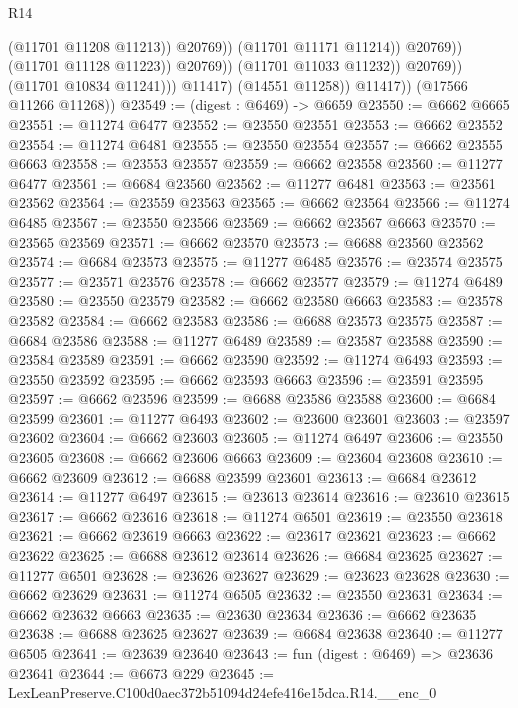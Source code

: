\begin{lexlean}{R14}
\begin{coremodule}
                                          (@11701 @11208 @11213))
                                        @20769))
                                    (@11701 @11171 @11214))
                                  @20769))
                              (@11701 @11128 @11223))
                            @20769))
                        (@11701 @11033 @11232))
                      @20769))
                  (@11701 @10834 @11241)))
              @11417)
            (@14551 @11258))
          @11417))
      (@17566 @11266 @11268))
@23549 := (digest : @6469) -> @6659
@23550 := @6662 @6665
@23551 := @11274 @6477
@23552 := @23550 @23551
@23553 := @6662 @23552
@23554 := @11274 @6481
@23555 := @23550 @23554
@23557 := @6662 @23555 @6663
@23558 := @23553 @23557
@23559 := @6662 @23558
@23560 := @11277 @6477
@23561 := @6684 @23560
@23562 := @11277 @6481
@23563 := @23561 @23562
@23564 := @23559 @23563
@23565 := @6662 @23564
@23566 := @11274 @6485
@23567 := @23550 @23566
@23569 := @6662 @23567 @6663
@23570 := @23565 @23569
@23571 := @6662 @23570
@23573 := @6688 @23560 @23562
@23574 := @6684 @23573
@23575 := @11277 @6485
@23576 := @23574 @23575
@23577 := @23571 @23576
@23578 := @6662 @23577
@23579 := @11274 @6489
@23580 := @23550 @23579
@23582 := @6662 @23580 @6663
@23583 := @23578 @23582
@23584 := @6662 @23583
@23586 := @6688 @23573 @23575
@23587 := @6684 @23586
@23588 := @11277 @6489
@23589 := @23587 @23588
@23590 := @23584 @23589
@23591 := @6662 @23590
@23592 := @11274 @6493
@23593 := @23550 @23592
@23595 := @6662 @23593 @6663
@23596 := @23591 @23595
@23597 := @6662 @23596
@23599 := @6688 @23586 @23588
@23600 := @6684 @23599
@23601 := @11277 @6493
@23602 := @23600 @23601
@23603 := @23597 @23602
@23604 := @6662 @23603
@23605 := @11274 @6497
@23606 := @23550 @23605
@23608 := @6662 @23606 @6663
@23609 := @23604 @23608
@23610 := @6662 @23609
@23612 := @6688 @23599 @23601
@23613 := @6684 @23612
@23614 := @11277 @6497
@23615 := @23613 @23614
@23616 := @23610 @23615
@23617 := @6662 @23616
@23618 := @11274 @6501
@23619 := @23550 @23618
@23621 := @6662 @23619 @6663
@23622 := @23617 @23621
@23623 := @6662 @23622
@23625 := @6688 @23612 @23614
@23626 := @6684 @23625
@23627 := @11277 @6501
@23628 := @23626 @23627
@23629 := @23623 @23628
@23630 := @6662 @23629
@23631 := @11274 @6505
@23632 := @23550 @23631
@23634 := @6662 @23632 @6663
@23635 := @23630 @23634
@23636 := @6662 @23635
@23638 := @6688 @23625 @23627
@23639 := @6684 @23638
@23640 := @11277 @6505
@23641 := @23639 @23640
@23643 := fun (digest : @6469) => @23636 @23641
@23644 := @6673 @229
@23645 := LexLeanPreserve.C100d0aec372b51094d24efe416e15dca.R14.__enc_0

\end{coremodule}
\end{lexlean}
